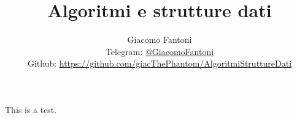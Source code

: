 
\title{\Huge \textbf{Algoritmi e strutture dati}}
\author{
  Giacomo Fantoni \\
  \small Telegram: \href{https://t.me/GiacomoFantoni}{@GiacomoFantoni} \\[3pt]
  \small Github: \href{https://github.com/giacThePhantom/AlgoritmiStruttureDati}{https://github.com/giacThePhantom/AlgoritmiStruttureDati}}

\maketitle
\tableofcontents









This is a test.


